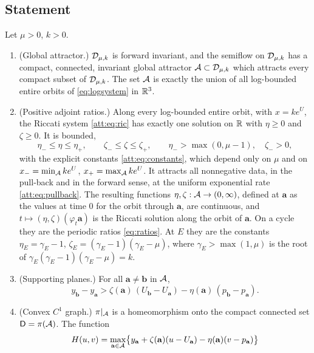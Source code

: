 \subsection{Statement}\label{att:sec:statement}
\begin{theorem}\label{thm:attractor}
Let $\mu>0$, $k>0$.
\begin{enumerate}[label=\textup{(A\arabic*)}]
\item \textup{(Global attractor.)} $\mathcal D_{\mu,k}$ is forward invariant, and the semiflow on $\mathcal D_{\mu,k}$ has a compact, connected, invariant global attractor $\mathcal A\subset\mathcal D_{\mu,k}$ which attracts every compact subset of $\mathcal D_{\mu,k}$. The set $\mathcal A$ is exactly the union of all log-bounded entire orbits of \eqref{eq:logsystem} in $\mathbb R^3$.
\item \textup{(Positive adjoint ratios.)} Along every log-bounded entire orbit, with $x=ke^{U}$, the Riccati system \eqref{att:eq:ric} has exactly one solution on $\mathbb R$ with $\eta\ge0$ and $\zeta\ge0$. It is bounded,
\begin{equation}\label{att:eq:bounds}
\eta_-\le\eta\le\eta_+,\qquad \zeta_-\le\zeta\le\zeta_+,\qquad \eta_->\max(0,\mu-1),\quad \zeta_->0,
\end{equation}
with the explicit constants \eqref{att:eq:constants}, which depend only on $\mu$ and on $x_-=\min_{\mathcal A}ke^{U}$, $x_+=\max_{\mathcal A}ke^{U}$. It attracts all nonnegative data, in the pull-back and in the forward sense, at the uniform exponential rate \eqref{att:eq:pullback}. The resulting functions $\eta,\zeta:\mathcal A\to(0,\infty)$, defined at $\mathbf a$ as the values at time $0$ for the orbit through $\mathbf a$, are continuous, and $t\mapsto(\eta,\zeta)(\varphi_t\mathbf a)$ is the Riccati solution along the orbit of $\mathbf a$. On a cycle they are the periodic ratios \eqref{eq:ratios}. At $E$ they are the constants $\eta_E=\gamma_E-1$, $\zeta_E=(\gamma_E-1)(\gamma_E-\mu)$, where $\gamma_E>\max(1,\mu)$ is the root of $\gamma_E(\gamma_E-1)(\gamma_E-\mu)=k$.
\item \textup{(Supporting planes.)} For all $\mathbf a\neq\mathbf b$ in $\mathcal A$,
\begin{equation}\label{att:eq:support}
y_{\mathbf b}-y_{\mathbf a}>\zeta(\mathbf a)\,(U_{\mathbf b}-U_{\mathbf a})-\eta(\mathbf a)\,(p_{\mathbf b}-p_{\mathbf a}).
\end{equation}
\item \textup{(Convex $C^1$ graph.)} $\pi|_{\mathcal A}$ is a homeomorphism onto the compact connected set $\mathsf D=\pi(\mathcal A)$. The function
\[
H(u,v)=\max_{\mathbf a\in\mathcal A}\bigl\{y_{\mathbf a}+\zeta(\mathbf a)(u-U_{\mathbf a})-\eta(\mathbf a)(v-p_{\mathbf a})\bigr\}
\]
\end{enumerate}
\end{theorem}
